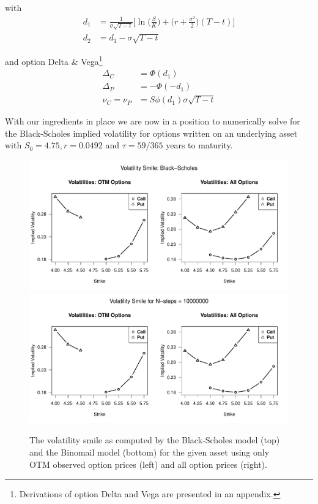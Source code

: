 \documentclass[11pt]{article}
\newlength\tindent
\renewcommand{\indent}{\hspace*{\tindent}}
\begin{document}
with 
\begin{align*}
	d_1 &= \frac{1}{\sigma\sqrt{T - t}} \bigg[\ln\bigg(\frac{S}{K}\bigg) + \bigg(r + \frac{\sigma^2}{2}\bigg)(T - t) \bigg]\\
	d_2 &= d_1 - \sigma\sqrt{T - t}
\end{align*}

and option Delta \& Vega\footnote{Derivations of option Delta and Vega are presented in an appendix.}
\begin{align*}
	\Delta_C &= \Phi(d_1) \\
	\Delta_P &= -\Phi(-d_1) \\
	\nu_C = \nu_P &= S\phi(d_1)\sigma\sqrt{T - t}
\end{align*}

\indent With our ingredients in place we are now in a position to numerically solve for the Black-Scholes implied volatility for options written on an underlying asset with $S_0 = 4.75, r = 0.0492$ and $\tau = 59/365$ years to maturity.

\begin{figure}[H]
	\centering
 	\includegraphics[scale=0.6]{../plots/q1/smile.pdf}
	\includegraphics[scale=0.6]{../plots/q1/smile_bin.pdf}
\caption{The volatility smile as computed by the Black-Scholes model (top) and the Binomail model (bottom) for the given asset using only OTM observed option prices (left) and all option prices (right).}
\label{fig:vol_smile}
\end{figure}
\end{document}
